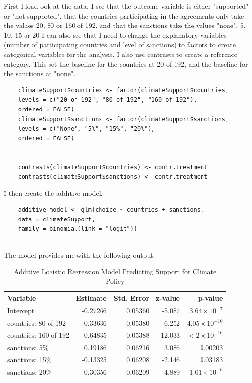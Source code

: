 \documentclass[12pt,letterpaper]{article}
\begin{document}
First I load ook at the data. I see that the outcome variable is either "supported" or "not supported", that the countries participating in the agreements only take the values 20, 80 or 160 of 192, and that the sanctions take the values "none", 5, 10, 15 or 20%
I can also see that I need to change the explanatory variables (number of participating countries and level of sanctions) to factors to create categorical variables for the analysis. I also use contrasts to create a reference category. This set the baseline for the countries at 20 of 192, and the baseline for the sanctions at "none". 
	
	\vspace{1cm}

\begin{BVerbatim}
	climateSupport$countries <- factor(climateSupport$countries, 
	levels = c("20 of 192", "80 of 192", "160 of 192"), 
	ordered = FALSE)
	climateSupport$sanctions <- factor(climateSupport$sanctions, 
	levels = c("None", "5%", "15%", "20%"),
	ordered = FALSE)
	
	
	contrasts(climateSupport$countries) <- contr.treatment
	contrasts(climateSupport$sanctions) <- contr.treatment
\end{BVerbatim}

I then create the additive model. 

\begin{BVerbatim}
	additive_model <- glm(choice ~ countries + sanctions, 
	data = climateSupport,
	family = binomial(link = "logit"))
	
\end{BVerbatim}


The model provides me with the following output: 

\begin{table}[ht]
	\centering
	\begin{tabular}{lrrrr}
		\hline
		\textbf{Variable} & \textbf{Estimate} & \textbf{Std. Error} & \textbf{z-value} & \textbf{p-value} \\
		\hline
		Intercept & -0.27266 & 0.05360 & -5.087 & $3.64\times10^{-7}$ \\
		countries: 80 of 192 & 0.33636 & 0.05380 & 6.252 & $4.05\times10^{-10}$ \\
		countries: 160 of 192 & 0.64835 & 0.05388 & 12.033 & $< 2\times10^{-16}$ \\
		sanctions: 5\% & 0.19186 & 0.06216 & 3.086 & 0.00203 \\
		sanctions: 15\% & -0.13325 & 0.06208 & -2.146 & 0.03183 \\
		sanctions: 20\% & -0.30356 & 0.06209 & -4.889 & $1.01\times10^{-6}$ \\
		\hline
	\end{tabular}
	\caption{Additive Logistic Regression Model Predicting Support for Climate Policy}
\end{table}
\end{document}
